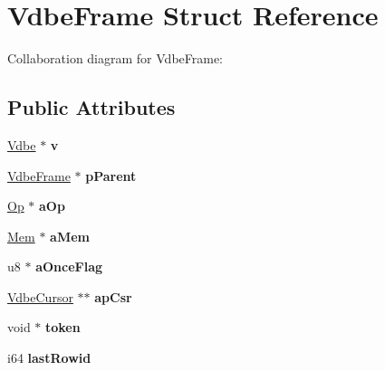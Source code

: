\hypertarget{struct_vdbe_frame}{\section{Vdbe\+Frame Struct Reference}
\label{struct_vdbe_frame}
}


Collaboration diagram for Vdbe\+Frame\+:
\subsection*{Public Attributes}
\begin{DoxyCompactItemize}
\item 
\hypertarget{struct_vdbe_frame_a2f6258356959c94398d1d006a740c4ce}{\hyperlink{struct_vdbe}{Vdbe} $\ast$ {\bfseries v}}\label{struct_vdbe_frame_a2f6258356959c94398d1d006a740c4ce}

\item 
\hypertarget{struct_vdbe_frame_afb11d8aa920f34720333f52737375d59}{\hyperlink{struct_vdbe_frame}{Vdbe\+Frame} $\ast$ {\bfseries p\+Parent}}\label{struct_vdbe_frame_afb11d8aa920f34720333f52737375d59}

\item 
\hypertarget{struct_vdbe_frame_a0e5670c52e8eeb7e66bf1e3bff8ce2b5}{\hyperlink{struct_vdbe_op}{Op} $\ast$ {\bfseries a\+Op}}\label{struct_vdbe_frame_a0e5670c52e8eeb7e66bf1e3bff8ce2b5}

\item 
\hypertarget{struct_vdbe_frame_a98b9eabf633e77d4ae2dfe9d13a43fdf}{\hyperlink{struct_mem}{Mem} $\ast$ {\bfseries a\+Mem}}\label{struct_vdbe_frame_a98b9eabf633e77d4ae2dfe9d13a43fdf}

\item 
\hypertarget{struct_vdbe_frame_a92608c14f2aa3be81e65d59000ef8bd8}{u8 $\ast$ {\bfseries a\+Once\+Flag}}\label{struct_vdbe_frame_a92608c14f2aa3be81e65d59000ef8bd8}

\item 
\hypertarget{struct_vdbe_frame_a5d373b3a195dbd1a31f5aa0dbe1822ee}{\hyperlink{struct_vdbe_cursor}{Vdbe\+Cursor} $\ast$$\ast$ {\bfseries ap\+Csr}}\label{struct_vdbe_frame_a5d373b3a195dbd1a31f5aa0dbe1822ee}

\item 
\hypertarget{struct_vdbe_frame_a11de10011ea2164995c6b616bba8a576}{void $\ast$ {\bfseries token}}\label{struct_vdbe_frame_a11de10011ea2164995c6b616bba8a576}

\item 
\hypertarget{struct_vdbe_frame_af655193217fb53c7acab9d24c94344aa}{i64 {\bfseries last\+Rowid}}\label{struct_vdbe_frame_af655193217fb53c7acab9d24c94344aa}


\end{DoxyCompactItemize}
